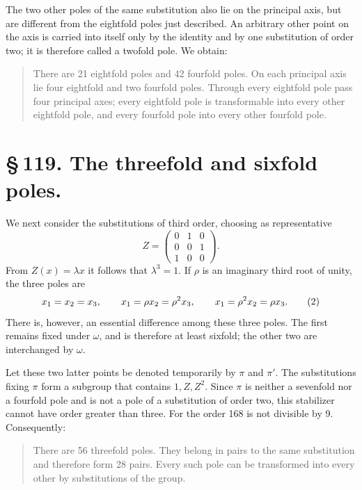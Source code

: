 \documentclass[11pt]{article}
\newcommand{\mat}[1]{\begin{pmatrix}#1\end{pmatrix}}
\begin{document}
The two other poles of the same substitution also lie on the principal axis, but are different from the eightfold poles just described. An arbitrary other point on the axis is carried into itself only by the identity and by one substitution of order two; it is therefore called a twofold pole. We obtain:

\begin{quote}
There are 21 eightfold poles and 42 fourfold poles. On each principal axis lie four eightfold and two fourfold poles. Through every eightfold pole pass four principal axes; every eightfold pole is transformable into every other eightfold pole, and every fourfold pole into every other fourfold pole.
\end{quote}

\section*{\S\,119. The threefold and sixfold poles.}

We next consider the substitutions of third order, choosing as representative
\begin{equation}
Z=\mat{0&1&0\\0&0&1\\1&0&0}.
\tag{1}
\end{equation}
From \(Z(x)=\lambda x\) it follows that \(\lambda^3=1\). If \(\rho\) is an imaginary third root of unity, the three poles are
\begin{equation}
x_1=x_2=x_3,\notag
\qquad
x_1=\rho x_2=\rho^2x_3,\notag
\qquad
x_1=\rho^2x_2=\rho x_3.
\tag{2}
\end{equation}
There is, however, an essential difference among these three poles. The first remains fixed under \(\omega\), and is therefore at least sixfold; the other two are interchanged by \(\omega\).

Let these two latter points be denoted temporarily by \(\pi\) and \(\pi'\). The substitutions fixing \(\pi\) form a subgroup that contains \(1,Z,Z^2\). Since \(\pi\) is neither a sevenfold nor a fourfold pole and is not a pole of a substitution of order two, this stabilizer cannot have order greater than three. For the order 168 is not divisible by 9. Consequently:

\begin{quote}
There are 56 threefold poles. They belong in pairs to the same substitution and therefore form 28 pairs. Every such pole can be transformed into every other by substitutions of the group.
\end{quote}
\end{document}
